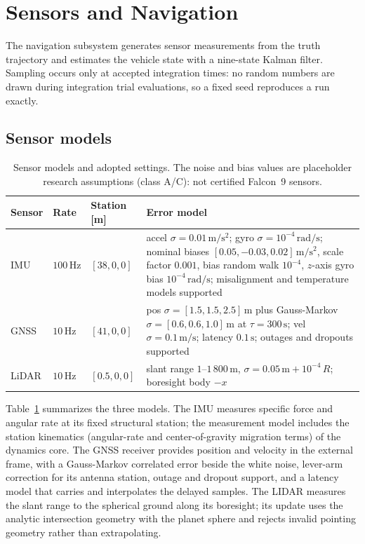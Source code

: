 \section{Sensors and Navigation}
\label{sec:navigation}

The navigation subsystem generates sensor measurements from the truth
trajectory and estimates the vehicle state with a nine-state Kalman
filter. Sampling occurs only at accepted integration times: no random
numbers are drawn during integration trial evaluations, so a fixed seed
reproduces a run exactly.

\subsection{Sensor models}
\label{sec:sensors}

\begin{table}[htbp]
\centering
\begin{tabular}{lllp{7.2cm}}
\toprule
Sensor & Rate & Station [m] & Error model \\
\midrule
IMU & $100\,\mathrm{Hz}$ & $[38, 0, 0]$ &
accel $\sigma = 0.01\,\mathrm{m/s^2}$;
gyro $\sigma = 10^{-4}\,\mathrm{rad/s}$;
nominal biases $[0.05, -0.03, 0.02]\,\mathrm{m/s^2}$,
scale factor $0.001$, bias random walk $10^{-4}$,
$z$-axis gyro bias $10^{-4}\,\mathrm{rad/s}$;
misalignment and temperature models supported \\
GNSS & $10\,\mathrm{Hz}$ & $[41, 0, 0]$ &
pos $\sigma = [1.5, 1.5, 2.5]\,\mathrm{m}$ plus
Gauss-Markov $\sigma = [0.6, 0.6, 1.0]\,\mathrm{m}$ at
$\tau = 300\,\mathrm{s}$;
vel $\sigma = 0.1\,\mathrm{m/s}$;
latency $0.1\,\mathrm{s}$; outages and dropouts supported \\
LiDAR & $10\,\mathrm{Hz}$ & $[0.5, 0, 0]$ &
slant range $1$--$1\,800\,\mathrm{m}$,
$\sigma = 0.05\,\mathrm{m} + 10^{-4}\,R$;
boresight body $-x$ \\
\bottomrule
\end{tabular}
\caption{Sensor models and adopted settings. The noise and bias values
are placeholder research assumptions (class A/C): not certified Falcon~9
sensors.}
\label{tab:sensors}
\end{table}

Table~\ref{tab:sensors} summarizes the three models. The \ac{IMU}
measures specific force and angular rate at its fixed structural
station; the measurement model includes the station kinematics
(angular-rate and center-of-gravity migration terms) of the dynamics
core. The \ac{GNSS} receiver provides position and velocity in the
external frame, with a Gauss-Markov correlated error beside the white
noise, lever-arm correction for its antenna station, outage and dropout
support, and a latency model that carries and interpolates the delayed
samples. The \ac{LIDAR} measures the slant range to the spherical ground
along its boresight; its update uses the analytic intersection geometry
with the planet sphere and rejects invalid pointing geometry rather
than extrapolating.

